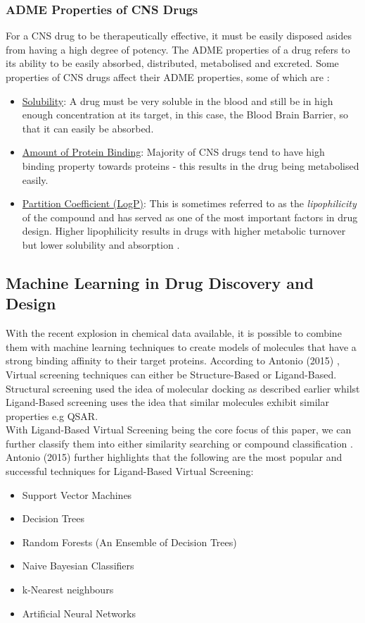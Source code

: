 \documentclass[a4paper,12pt]{article}
\begin{document}
			\subsubsection{ADME Properties of CNS Drugs}
			For a CNS drug to be therapeutically effective, it must be easily disposed asides from having a high degree of potency. The ADME properties of a drug refers to its ability to be easily absorbed, distributed, metabolised and excreted. Some properties of CNS drugs affect their ADME properties, some of which are \cite{Hassanetal2005}:
				\begin{itemize}
					\item \underline{Solubility}: A drug must be very soluble in the blood and still be in high enough concentration at its target, in this case, the Blood Brain Barrier, so that it can easily be absorbed.
					\item \underline{Amount of Protein Binding}: Majority of CNS drugs tend to have high binding property towards proteins - this results in the drug being metabolised easily.
					\item \underline{Partition Coefficient (LogP)}: This is sometimes referred to as the \textit{lipophilicity} of the compound and has served as one of the most important factors in drug design. Higher lipophilicity results in drugs with higher metabolic turnover but lower solubility and absorption \cite{Hassanetal2005}. 
				\end{itemize}	
		\subsection{Machine Learning in Drug Discovery and Design}
		With the recent explosion in chemical data available, it is possible to combine them with machine learning techniques to create models of molecules that have a strong binding affinity to their target proteins. According to Antonio (2015) \cite{Antonio2015}, Virtual screening techniques can either be Structure-Based or Ligand-Based. Structural screening used the idea of molecular docking as described earlier whilst Ligand-Based screening uses the idea that similar molecules exhibit similar properties e.g QSAR. 
		\\
		With Ligand-Based Virtual Screening being the core focus of this paper, we can further classify them into either similarity searching or compound classification \cite{Antonio2015}. Antonio (2015) \cite{Antonio2015} further highlights that the following are the most popular and successful techniques for Ligand-Based Virtual Screening:
			\begin{itemize}
				\item Support Vector Machines
				\item Decision Trees
				\item Random Forests (An Ensemble of Decision Trees)
				\item Naive Bayesian Classifiers
				\item k-Nearest neighbours
				\item Artificial Neural Networks
			\end{itemize} 
	
\end{document}
